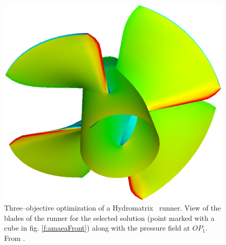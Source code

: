 \documentclass{vki_ls}
\begin{document}
\begin{figure}
    \centering
    \includegraphics[trim=100 0 0 0,angle=-90,scale=0.5]{amaea/matrixRes.eps}
    \caption{Three--objective optimization of a Hydromatrix\textregistered~
             runner. View of the blades of the runner for the selected 
	     solution (point marked with a cube in fig. \ref{f:amaeaFront}) 
	     along with the pressure field at $OP_1$. From \cite{LTT_3_104}.}
    \label{f:amaeaBlade}
\end{figure}
%
\end{document}

